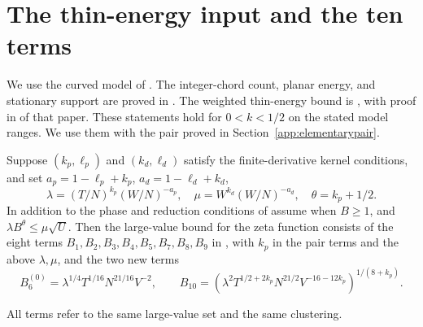 \section{The thin-energy input and the ten terms}\label{sec:thininput}
We use the curved model of \cite[Section 3]{Weighted}.
The integer-chord count, planar energy, and stationary support are
proved in \cite[Sections 2--3]{Thin}. The weighted thin-energy bound
is \cite[Proposition~\ref*{p-prop:pairprofile}]{Thin}, with proof in
\cite[Appendix~\ref*{p-app:pairproof}]{Thin} of that paper.
These statements hold for $0<k<1/2$ on the stated model ranges.
We use them with the pair proved in Section~\ref{app:elementarypair}.

\begin{proposition}
\label{prop:tentermreturn}
Suppose $(k_p,\ell_p)$ and $(k_d,\ell_d)$ satisfy the finite-derivative
kernel conditions, and set $a_p=1-\ell_p+k_p$, $a_d=1-\ell_d+k_d$,
\[
 \lambda=(T/N)^{k_p}(W/N)^{-a_p},\quad
 \mu=W^{k_d}(W/N)^{-a_d},\quad \theta=k_p+1/2.
\]
In addition to the phase and reduction conditions of \cite{Weighted} assume
\cite[(\ref*{p-eq:thinrange})]{Thin} when $B\ge1$, and
$\lambda B^\theta\le\mu\sqrt U$.
Then the large-value bound for the zeta function consists of the eight terms
$B_1,B_2,B_3,B_4,B_5,B_7,B_8,B_9$ in \cite[(\ref*{six-eq:nine})]{Weighted}, with $k_p$
in the pair terms and the above $\lambda,\mu$, and the two new terms
\begin{equation}\label{eq:newcurvatureterms}
 B_6^{(0)}=\lambda^{1/4}T^{1/16}N^{21/16}V^{-2},\qquad
 B_{10}=\left(\lambda^2T^{1/2+2k_p}N^{21/2}
                         V^{-16-12k_p}\right)^{1/(8+k_p)}.
\end{equation}
\end{proposition}
All terms refer to the same large-value set and the same clustering.
